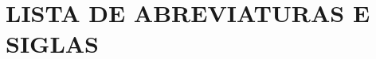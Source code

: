 \documentclass[tec, rde, classic, a4paper]{x_cuidado_com_esse_arquivo}
\begin{document}
    \chapter*{LISTA DE ABREVIATURAS E SIGLAS}
    \begin{acronym}[]
        
    \end{acronym}

    \tableofcontents %

    
                                    \mainmatter %
    
    
    
    
    
    

    
    
                                    \backmatter  %
    
    
    
    
\end{document}
